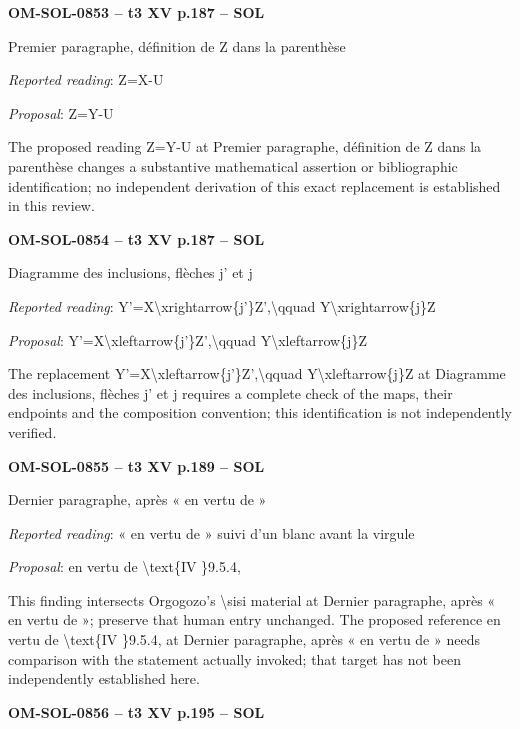 \par\noindent\textbf{OM-SOL-0853 -- t3 XV p.187 -- SOL}\par
Premier paragraphe, définition de Z dans la parenthèse\par
\emph{Reported reading}: Z=\allowbreak X-U\par
\emph{Proposal}: Z=\allowbreak Y-U\par
The proposed reading Z=\allowbreak Y-U at Premier paragraphe, définition de Z dans la parenthèse changes a substantive mathematical assertion or bibliographic identification; no independent derivation of this exact replacement is established in this review.\par
\par\noindent\textbf{OM-SOL-0854 -- t3 XV p.187 -- SOL}\par
Diagramme des inclusions, flèches j' et j\par
\emph{Reported reading}: Y'=\allowbreak X\textbackslash{}xrightarrow\{j'\}Z',\textbackslash{}qquad Y\textbackslash{}xrightarrow\{j\}Z\par
\emph{Proposal}: Y'=\allowbreak X\textbackslash{}xleftarrow\{j'\}Z',\textbackslash{}qquad Y\textbackslash{}xleftarrow\{j\}Z\par
The replacement Y'=\allowbreak X\textbackslash{}xleftarrow\{j'\}Z',\textbackslash{}qquad Y\textbackslash{}xleftarrow\{j\}Z at Diagramme des inclusions, flèches j' et j requires a complete check of the maps, their endpoints and the composition convention; this identification is not independently verified.\par
\par\noindent\textbf{OM-SOL-0855 -- t3 XV p.189 -- SOL}\par
Dernier paragraphe, après « en vertu de »\par
\emph{Reported reading}: « en vertu de » suivi d'un blanc avant la virgule\par
\emph{Proposal}: en vertu de \textbackslash{}text\{IV \}9.5.4,\par
This finding intersects Orgogozo's \textbackslash{}sisi material at Dernier paragraphe, après « en vertu de »; preserve that human entry unchanged. The proposed reference en vertu de \textbackslash{}text\{IV \}9.5.4, at Dernier paragraphe, après « en vertu de » needs comparison with the statement actually invoked; that target has not been independently established here.\par
\par\noindent\textbf{OM-SOL-0856 -- t3 XV p.195 -- SOL}\par
